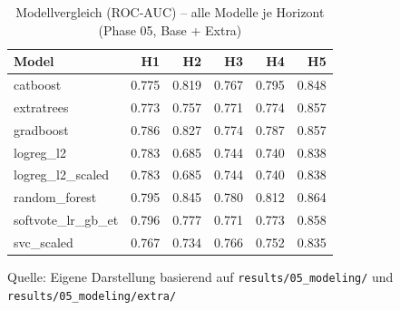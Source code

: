 \begin{table}[H]
  \centering
  \caption{Modellvergleich (ROC-AUC) – alle Modelle je Horizont (Phase 05, Base + Extra)}
  \label{tab:phase06_model_eval_matrix}
  \begin{tabular}{l r r r r r}
    \toprule
    Model & H1 & H2 & H3 & H4 & H5 \\
    \midrule
    catboost & 0.775 & 0.819 & 0.767 & 0.795 & 0.848 \\
    extratrees & 0.773 & 0.757 & 0.771 & 0.774 & 0.857 \\
    gradboost & 0.786 & 0.827 & 0.774 & 0.787 & 0.857 \\
    logreg\_l2 & 0.783 & 0.685 & 0.744 & 0.740 & 0.838 \\
    logreg\_l2\_scaled & 0.783 & 0.685 & 0.744 & 0.740 & 0.838 \\
    random\_forest & 0.795 & 0.845 & 0.780 & 0.812 & 0.864 \\
    softvote\_lr\_gb\_et & 0.796 & 0.777 & 0.771 & 0.773 & 0.858 \\
    svc\_scaled & 0.767 & 0.734 & 0.766 & 0.752 & 0.835 \\
    \bottomrule
  \end{tabular}
  \par\smallskip
  {\footnotesize Quelle: Eigene Darstellung basierend auf \texttt{results/05\_modeling/} und \texttt{results/05\_modeling/extra/}}
\end{table}
